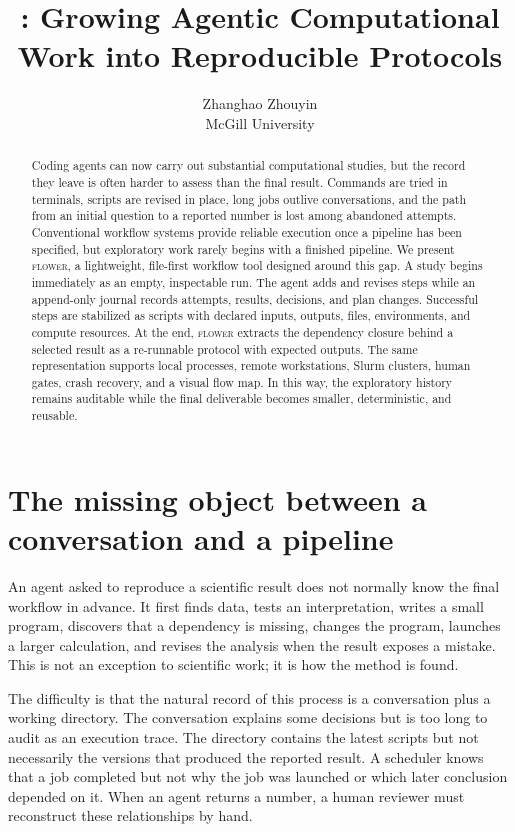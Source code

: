 \documentclass[10pt]{article}
\title{\flower{}: Growing Agentic Computational Work into Reproducible Protocols}
\author{Zhanghao Zhouyin\\McGill University}
\date{}
\newcommand{\flower}{\textsc{flower}}
\begin{document}
\maketitle

\begin{abstract}
Coding agents can now carry out substantial computational studies, but the record they leave is often
harder to assess than the final result. Commands are tried in terminals, scripts are revised in place,
long jobs outlive conversations, and the path from an initial question to a reported number is lost among
abandoned attempts. Conventional workflow systems provide reliable execution once a pipeline has been
specified, but exploratory work rarely begins with a finished pipeline. We present \flower{}, a lightweight,
file-first workflow tool designed around this gap. A study begins immediately as an empty, inspectable run.
The agent adds and revises steps while an append-only journal records attempts, results, decisions, and plan
changes. Successful steps are stabilized as scripts with declared inputs, outputs, files, environments, and
compute resources. At the end, \flower{} extracts the dependency closure behind a selected result as a
re-runnable protocol with expected outputs. The same representation supports local processes, remote
workstations, Slurm clusters, human gates, crash recovery, and a visual flow map. In this way, the exploratory
history remains auditable while the final deliverable becomes smaller, deterministic, and reusable.
\end{abstract}

\section{The missing object between a conversation and a pipeline}

An agent asked to reproduce a scientific result does not normally know the final workflow in advance. It
first finds data, tests an interpretation, writes a small program, discovers that a dependency is missing,
changes the program, launches a larger calculation, and revises the analysis when the result exposes a
mistake. This is not an exception to scientific work; it is how the method is found.

The difficulty is that the natural record of this process is a conversation plus a working directory. The
conversation explains some decisions but is too long to audit as an execution trace. The directory contains
the latest scripts but not necessarily the versions that produced the reported result. A scheduler knows that
a job completed but not why the job was launched or which later conclusion depended on it. When an agent
returns a number, a human reviewer must reconstruct these relationships by hand.
\end{document}
